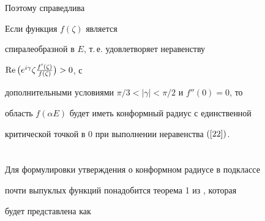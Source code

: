 Поэтому справедлива





\begin{thm} Если функция $f(\zeta)$ является


спиралеобразной в $E$, т.\,е. удовлетворяет неравенству


$\operatorname{Re}\big(e^{i\gamma}\zeta\frac{f'(\zeta)}{f(\zeta)}\big)>0$, с


дополнительными условиями $\pi/3<|\gamma|< {\pi}/{2}$ и $f''(0)=0$, то


область $f(\alpha E)$ будет иметь конформный радиус с единственной


критической точкой в $0$ при выполнении неравенства $(\ref{22})$.


\end{thm}





\section{}





Для формулировки утверждения о конформном радиусе в подклассе


почти выпуклых функций понадобится теорема 1 из \cite{4}, которая


будет представлена как


\medskip





